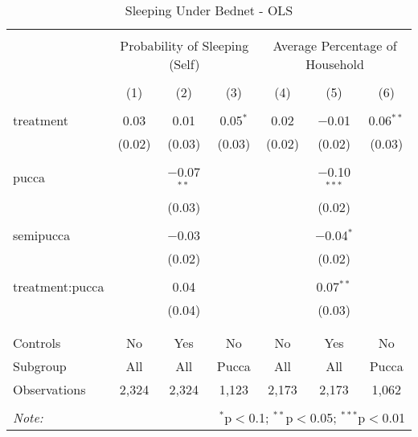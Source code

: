 
\begin{table}[!htbp] \centering 
  \caption{Sleeping Under Bednet - OLS} 
  \label{tbl:Sleeping Under Bednet - OLS} 
\begin{tabular}{@{\extracolsep{5pt}}lcccccc} 
\\[-1.8ex]\hline 
\hline \\[-1.8ex] 
 & \multicolumn{3}{c}{Probability of Sleeping (Self)} & \multicolumn{3}{c}{Average Percentage of Household} \\ 
\\[-1.8ex] & (1) & (2) & (3) & (4) & (5) & (6)\\ 
\hline \\[-1.8ex] 
 treatment & 0.03 & 0.01 & 0.05$^{*}$ & 0.02 & $-$0.01 & 0.06$^{**}$ \\ 
  & (0.02) & (0.03) & (0.03) & (0.02) & (0.02) & (0.03) \\ 
  & & & & & & \\ 
 pucca &  & $-$0.07$^{**}$ &  &  & $-$0.10$^{***}$ &  \\ 
  &  & (0.03) &  &  & (0.02) &  \\ 
  & & & & & & \\ 
 semipucca &  & $-$0.03 &  &  & $-$0.04$^{*}$ &  \\ 
  &  & (0.02) &  &  & (0.02) &  \\ 
  & & & & & & \\ 
 treatment:pucca &  & 0.04 &  &  & 0.07$^{**}$ &  \\ 
  &  & (0.04) &  &  & (0.03) &  \\ 
  & & & & & & \\ 
\hline \\[-1.8ex] 
Controls & No & Yes & No & No & Yes & No \\ 
Subgroup & All & All & Pucca & All & All & Pucca \\ 
Observations & 2,324 & 2,324 & 1,123 & 2,173 & 2,173 & 1,062 \\ 
\hline 
\hline \\[-1.8ex] 
\textit{Note:}  & \multicolumn{6}{r}{$^{*}$p$<$0.1; $^{**}$p$<$0.05; $^{***}$p$<$0.01} \\ 
\end{tabular} 
\end{table} 
